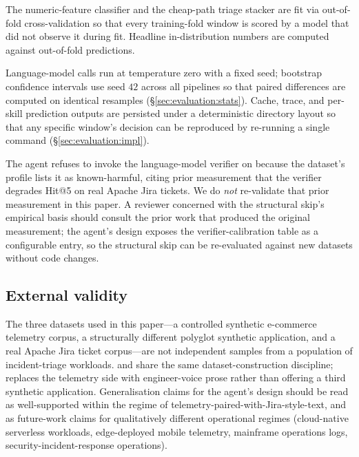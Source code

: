  The numeric-feature classifier and the cheap-path triage stacker are fit via out-of-fold cross-validation so that every training-fold window is scored by a model that did not observe it during fit. Headline in-distribution numbers are computed against out-of-fold predictions.

 Language-model calls run at temperature zero with a fixed seed; bootstrap confidence intervals use seed $42$ across all pipelines so that paired differences are computed on identical resamples (\S\ref{sec:evaluation:stats}). Cache, trace, and per-skill prediction outputs are persisted under a deterministic directory layout so that any specific window's decision can be reproduced by re-running a single command (\S\ref{sec:evaluation:impl}).

 The agent refuses to invoke the language-model verifier on \dswol{} because the dataset's profile lists it as known-harmful, citing prior measurement that the verifier degrades Hit@5 on real Apache Jira tickets. We do \emph{not} re-validate that prior measurement in this paper. A reviewer concerned with the structural skip's empirical basis should consult the prior work that produced the original measurement; the agent's design exposes the verifier-calibration table as a configurable entry, so the structural skip can be re-evaluated against new datasets without code changes.

\subsection{External validity}
\label{sec:threats:external}

 The three datasets used in this paper---a controlled synthetic e-commerce telemetry corpus, a structurally different polyglot synthetic application, and a real Apache Jira ticket corpus---are not independent samples from a population of incident-triage workloads. \dsob{} and \dsotel{} share the same dataset-construction discipline; \dswol{} replaces the telemetry side with engineer-voice prose rather than offering a third synthetic application. Generalisation claims for the agent's design should be read as well-supported within the regime of telemetry-paired-with-Jira-style-text, and as future-work claims for qualitatively different operational regimes (cloud-native serverless workloads, edge-deployed mobile telemetry, mainframe operations logs, security-incident-response operations).

